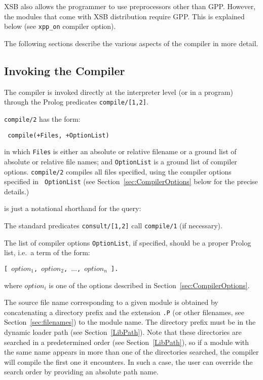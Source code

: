 XSB also allows the programmer to use preprocessors other than GPP.
However, the modules that come with XSB distribution require GPP.
This is explained below (see \verb|xpp_on| compiler option).

The following sections describe the various aspects of the compiler 
in more detail.


\subsection{Invoking the Compiler} \label{compiler_invoking}

The compiler is invoked directly at the interpreter level (or in a 
program) through the Prolog predicates {\tt compile/[1,2]}.  

 {\tt compile/2} has the form: 
\begin{center}{\tt	
	compile(+Files, +OptionList)
}
\end{center}
in which {\tt Files} is either an absolute or relative filename or a
ground list of absolute or relative file names; and {\tt OptionList}
is a ground list of compiler options.  {\tt compile/2} compiles all
files specified, using the compiler options specified in {\tt
OptionList} (see Section~\ref{sec:CompilerOptions} below for the
precise details.)


\noindent
is just a notational shorthand for the query:


The standard predicates {\tt consult/[1,2]} call {\tt compile/1} (if
necessary).  

The list of compiler options {\tt OptionList}, if specified, 
should be a proper Prolog list, i.e.\ a term of the form:
\begin{center}
	{\tt [ $option_1$, $option_2$, $\ldots$, $option_n$ ].}
\end{center}
where $option_i$ is one of the options described in
Section~\ref{sec:CompilerOptions}.

The source file name corresponding to a given module is obtained by 
concatenating a directory prefix and the extension {\tt .P} (or other
filenames, see Section~\ref{sec:filenames}) 
to the module name.  The directory prefix must be in the
dynamic loader path (see Section~\ref{LibPath}).
Note that these directories are searched in a predetermined
order (see Section~\ref{LibPath}), so if a module with the same name
appears in more than one of the directories searched, the compiler 
will compile the first one it encounters.  In such a case, the user can 
override the search order by providing an absolute path name.

